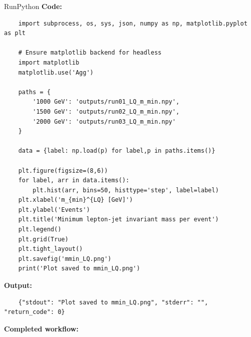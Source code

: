\documentclass[11pt,oneside]{article}
\numberwithin{equation}{section}
\begin{document}
\begin{orchestralagentmessage}

    \begin{orchestraltoolmessage}{RunPython}
        \textbf{Code:}\vspace{-0.2in}

        \begin{verbatim}
    import subprocess, os, sys, json, numpy as np, matplotlib.pyplot as plt

    # Ensure matplotlib backend for headless
    import matplotlib
    matplotlib.use('Agg')

    paths = {
        '1000 GeV': 'outputs/run01_LQ_m_min.npy',
        '1500 GeV': 'outputs/run02_LQ_m_min.npy',
        '2000 GeV': 'outputs/run03_LQ_m_min.npy'
    }

    data = {label: np.load(p) for label,p in paths.items()}

    plt.figure(figsize=(8,6))
    for label, arr in data.items():
        plt.hist(arr, bins=50, histtype='step', label=label)
    plt.xlabel('m_{min}^{LQ} [GeV]')
    plt.ylabel('Events')
    plt.title('Minimum lepton‑jet invariant mass per event')
    plt.legend()
    plt.grid(True)
    plt.tight_layout()
    plt.savefig('mmin_LQ.png')
    print('Plot saved to mmin_LQ.png')

        \end{verbatim}

        \textbf{Output:}\vspace{-0.2in}

        \begin{verbatim}
    {"stdout": "Plot saved to mmin_LQ.png", "stderr": "", "return_code": 0}
        \end{verbatim}
    \end{orchestraltoolmessage}

    \vspace{0.1in}

    \textbf{Completed workflow:}


\end{orchestralagentmessage}
\end{document}
